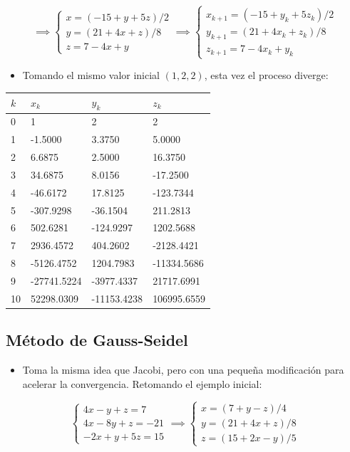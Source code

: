\documentclass[openany]{book}
\providecommand{\tightlist}{%
  \setlength{\itemsep}{0pt}\setlength{\parskip}{0pt}}
\begin{document}
\[
\implies
\begin{cases} 
x=(-15+y+5z)/2 \\
y=(21+4x+z)/8 \\
z=7-4x+y
\end{cases}
\implies
\begin{cases} 
x_{k+1}=(-15+y_k+5z_k)/2 \\
y_{k+1}=(21+4x_k+z_k)/8 \\
z_{k+1}=7-4x_k+y_k
\end{cases}
\]

\begin{itemize}
\tightlist
\item
  Tomando el mismo valor inicial \((1, 2, 2)\), esta vez el proceso diverge:
\end{itemize}

\begin{longtable}[]{@{}llll@{}}
\toprule
\(k\) & \(x_k\) & \(y_k\) & \(z_k\)\tabularnewline
\midrule
\endhead
0 & 1 & 2 & 2\tabularnewline
1 & -1.5000 & 3.3750 & 5.0000\tabularnewline
2 & 6.6875 & 2.5000 & 16.3750\tabularnewline
3 & 34.6875 & 8.0156 & -17.2500\tabularnewline
4 & -46.6172 & 17.8125 & -123.7344\tabularnewline
5 & -307.9298 & -36.1504 & 211.2813\tabularnewline
6 & 502.6281 & -124.9297 & 1202.5688\tabularnewline
7 & 2936.4572 & 404.2602 & -2128.4421\tabularnewline
8 & -5126.4752 & 1204.7983 & -11334.5686\tabularnewline
9 & -27741.5224 & -3977.4337 & 21717.6991\tabularnewline
10 & 52298.0309 & -11153.4238 & 106995.6559\tabularnewline
\bottomrule
\end{longtable}

\hypertarget{muxe9todo-de-gauss-seidel}{%
\subsection{Método de Gauss-Seidel}\label{muxe9todo-de-gauss-seidel}}

\begin{itemize}
\tightlist
\item
  Toma la misma idea que Jacobi, pero con una pequeña modificación para acelerar la convergencia. Retomando el ejemplo inicial:
\end{itemize}

\[
\begin{cases} 
4x-y+z=7 \\
4x-8y+z=-21 \\
-2x+y+5z=15
\end{cases}
\implies
\begin{cases} 
x=(7+y-z)/4 \\
y=(21+4x+z)/8 \\
z=(15+2x-y)/5
\end{cases}
\]
\end{document}
